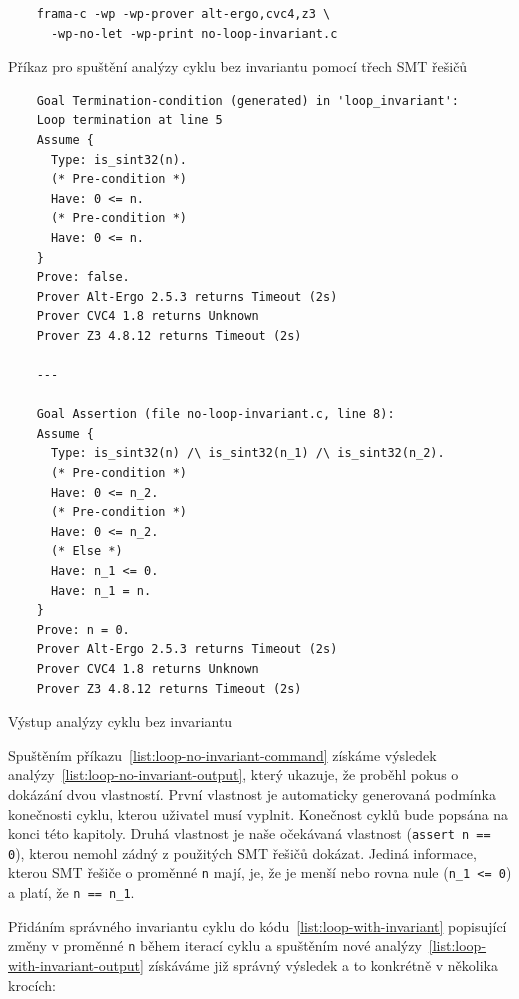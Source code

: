 \begin{listing}[H]
    \begin{verbatim}
    frama-c -wp -wp-prover alt-ergo,cvc4,z3 \
      -wp-no-let -wp-print no-loop-invariant.c
    \end{verbatim}
    \caption{Příkaz pro spuštění analýzy cyklu bez invariantu pomocí třech SMT řešičů}
    \label{list:loop-no-invariant-command}
\end{listing}

\begin{listing}[H]
    \begin{verbatim}
    Goal Termination-condition (generated) in 'loop_invariant':
    Loop termination at line 5
    Assume {
      Type: is_sint32(n).
      (* Pre-condition *)
      Have: 0 <= n.
      (* Pre-condition *)
      Have: 0 <= n.
    }
    Prove: false.
    Prover Alt-Ergo 2.5.3 returns Timeout (2s)
    Prover CVC4 1.8 returns Unknown
    Prover Z3 4.8.12 returns Timeout (2s)

    ---

    Goal Assertion (file no-loop-invariant.c, line 8):
    Assume {
      Type: is_sint32(n) /\ is_sint32(n_1) /\ is_sint32(n_2).
      (* Pre-condition *)
      Have: 0 <= n_2.
      (* Pre-condition *)
      Have: 0 <= n_2.
      (* Else *)
      Have: n_1 <= 0.
      Have: n_1 = n.
    }
    Prove: n = 0.
    Prover Alt-Ergo 2.5.3 returns Timeout (2s)
    Prover CVC4 1.8 returns Unknown
    Prover Z3 4.8.12 returns Timeout (2s)
    \end{verbatim}
    \caption{Výstup analýzy cyklu bez invariantu}
    \label{list:loop-no-invariant-output}
\end{listing}

Spuštěním příkazu~\ref{list:loop-no-invariant-command} získáme výsledek analýzy~\ref{list:loop-no-invariant-output},
který ukazuje, že proběhl pokus o dokázání dvou vlastností.
První vlastnost je automaticky generovaná podmínka konečnosti cyklu, kterou uživatel musí vyplnit.
Konečnost cyklů bude popsána na konci této kapitoly.
Druhá vlastnost je naše očekávaná vlastnost (\texttt{assert n == 0}),
kterou nemohl zádný z použitých SMT řešičů dokázat.
Jediná informace, kterou SMT řešiče o proměnné \texttt{n} mají,
je, že je menší nebo rovna nule (\texttt{n\_1 <= 0}) a platí, že \texttt{n == n\_1}.


Přidáním správného invariantu cyklu do kódu~\ref{list:loop-with-invariant}
popisující změny v proměnné \texttt{n} během iterací cyklu
a spuštěním nové analýzy~\ref{list:loop-with-invariant-output}
získáváme již správný výsledek a to konkrétně v několika krocích:

